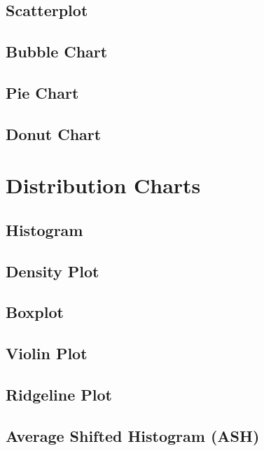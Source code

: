 \documentclass[
  letterpaper,
  DIV=11,
  numbers=noendperiod]{scrreprt}
\begin{document}
\subsection{Scatterplot}\label{scatterplot}

\subsection{Bubble Chart}\label{bubble-chart}

\subsection{Pie Chart}\label{pie-chart}

\subsection{Donut Chart}\label{donut-chart}

\section{Distribution Charts}\label{distribution-charts}

\subsection{Histogram}\label{histogram-1}

\subsection{Density Plot}\label{density-plot}

\subsection{Boxplot}\label{boxplot-1}

\subsection{Violin Plot}\label{violin-plot}

\subsection{Ridgeline Plot}\label{ridgeline-plot}

\subsection{Average Shifted Histogram
(ASH)}\label{average-shifted-histogram-ash}
\end{document}
